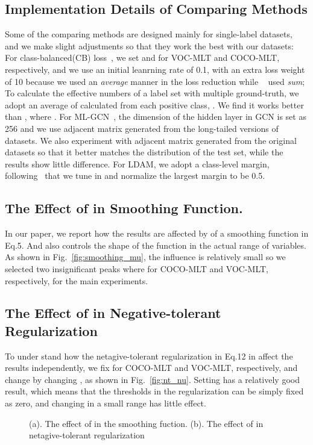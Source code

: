 \documentclass[runningheads]{llncs}
\begin{document}
\subsection{Implementation Details of Comparing Methods}
Some of the comparing methods are designed mainly for single-label datasets, and we make slight adjustments so that they work the best with our datasets:
For class-balanced(CB) loss~\cite{cui2019cb}, we set  and  for VOC-MLT and COCO-MLT, respectively, and we use an initial leanrning rate of 0.1, with an extra loss weight of 10 because we used an \textit{average} manner in the loss reduction while ~\cite{cui2019cb} used \textit{sum}; 
To calculate the effective numbers of a label set with multiple ground-truth, we adopt an average of  calculated from each positive class, . 
We find it works better than , where .
For ML-GCN~\cite{chen2019mlgcn}, the dimension of the hidden layer in GCN is set as 256 and we use adjacent matrix generated from the long-tailed versions of datasets.
We also experiment with adjacent matrix generated from the original datasets so that it better matches the distribution of the test set, while the results show little difference.
For LDAM, we adopt a class-level margin, following~\cite{cao2019ldam} that we tune  in  and normalize the largest margin to be 0.5.

\subsection{The Effect of  in Smoothing Function.}
In our paper, we report how the results are affected by  of a smoothing function in Eq.5. And  also controls the shape of the function in the actual range of variables.
As shown in Fig.~\ref{fig:smoothing_mu}, the influence is relatively small so we selected two insignificant peaks where  for COCO-MLT and VOC-MLT, respectively, for the main experiments.
\subsection{The Effect of  in Negative-tolerant Regularization}
To under stand how  the netagive-tolerant regularization in Eq.12 in affect the results independently, we fix  for COCO-MLT and VOC-MLT, respectively, and change  by changing , as shown in Fig.~\ref{fig:nt_nu}.
Setting  has a relatively good result, which means that the thresholds in the regularization can be simply fixed as zero, and changing  in a small range has little effect.

\begin{figure}[t]
     \hfill
    \subfloat[\label{fig:nt_nu}]{\texttt{[image: nt\_nu]}}
    \caption{
        (a). The effect of  in the smoothing fuction.
        (b). The effect of  in netagive-tolerant regularization 
    }
\end{figure}
 
\end{document}
